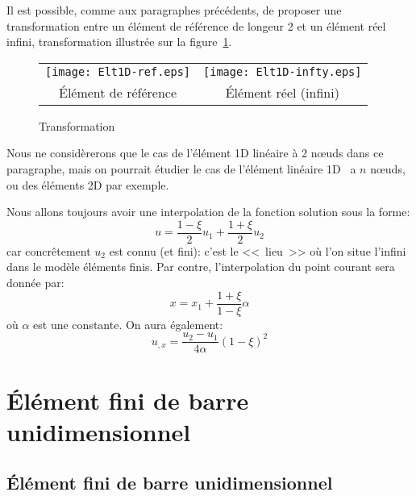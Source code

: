 Il est possible, comme aux paragraphes précédents, de proposer une transformation
entre un élément de référence de longeur 2 et un élément réel infini, transformation illustrée sur la figure~\ref{fig:ex2:trans}.
\begin{figure}[ht]\centering
\begin{tabular}{cc}
\texttt{[image: Elt1D-ref.eps]} &
\texttt{[image: Elt1D-infty.eps]} \\
Élément de référence & Élément réel (infini)
\end{tabular}\caption{Transformation}\label{fig:ex2:trans}
\end{figure}
\medskip
Nous ne considèrerons que le cas de l'élément 1D linéaire à 2 nœuds dans ce
paragraphe, mais on pourrait étudier le cas de l'élément linéaire 1D \ a $n$ nœuds,
ou des éléments 2D par exemple.

\medskip
Nous allons toujours avoir une interpolation de la fonction solution sous la forme:
\begin{equation} u =\frac{1-\xi}2 u_1 + \frac{1+\xi}2 u_2\end{equation}
car concrêtement $u_2$ est connu (et fini): c'est le <<~lieu~>> où l'on situe l'infini dans le
modèle éléments finis.
\medskip
Par contre, l'interpolation du point courant sera donnée par:
\begin{equation}
x=x_1+\frac{1+\xi}{1-\xi}\alpha
\end{equation}
où $\alpha$ est une constante.
\medskip
On aura également:
\begin{equation} u_{,x} = \frac{u_2-u_1}{4\alpha} (1-\xi)^2 \end{equation}

\medskip
\ifVersionAvecExemplesSepares
   \section{Élément fini de barre unidimensionnel}\label{Sec-barre1D}
\else
   \subsection{Élément fini de barre unidimensionnel}\label{Sec-barre1D}
\fi

